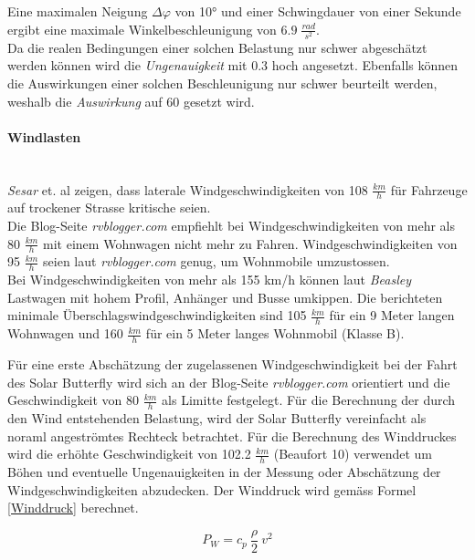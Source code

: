\begin{description}
    Eine maximalen Neigung $\Delta \varphi$ von 10° und einer Schwingdauer von einer Sekunde ergibt eine maximale Winkelbeschleunigung von $6.9 \; \frac{rad}{s^2}$.\\
    Da die realen Bedingungen einer solchen Belastung nur schwer abgeschätzt werden können wird die \emph{Ungenauigkeit} mit 0.3 hoch angesetzt. Ebenfalls können die Auswirkungen einer solchen Beschleunigung nur schwer beurteilt werden, weshalb die \emph{Auswirkung} auf 60 gesetzt wird.
  \end{description}

  \paragraph{Windlasten}\mbox{}\\
  \emph{Sesar} et. al \cite{Wind.1} zeigen, dass laterale Windgeschwindigkeiten von 108 $\frac{km}{h}$ für Fahrzeuge auf trockener Strasse kritische seien.\\
  Die Blog-Seite \emph{rvblogger.com} \cite{Wind.2} empfiehlt bei Windgeschwindigkeiten von mehr als 80 $\frac{km}{h}$ mit einem Wohnwagen nicht mehr zu Fahren. Windgeschwindigkeiten von 95 $\frac{km}{h}$ seien laut \emph{rvblogger.com} genug, um Wohnmobile umzustossen.\\
  Bei Windgeschwindigkeiten von mehr als 155 km/h können laut \emph{Beasley} \cite{Wind.3} Lastwagen mit hohem Profil, Anhänger und Busse umkippen. Die berichteten minimale Überschlagswindgeschwindigkeiten sind 105 $\frac{km}{h}$ für ein 9 Meter langen Wohnwagen und 160 $\frac{km}{h}$ für ein 5 Meter langes Wohnmobil (Klasse B).

  Für eine erste Abschätzung der zugelassenen Windgeschwindigkeit bei der Fahrt des Solar Butterfly wird sich an der Blog-Seite \emph{rvblogger.com} orientiert und die Geschwindigkeit von 80 $\frac{km}{h}$ als Limitte festgelegt. Für die Berechnung der durch den Wind entstehenden Belastung, wird der Solar Butterfly vereinfacht als noraml angeströmtes Rechteck betrachtet. Für die Berechnung des Winddruckes wird die erhöhte Geschwindigkeit von 102.2 $\frac{km}{h}$ (Beaufort 10) verwendet um Böhen und eventuelle Ungenauigkeiten in der Messung oder Abschätzung der Windgeschwindigkeiten abzudecken. Der Winddruck wird gemäss Formel \ref{Winddruck} berechnet.

  \begin{equation}
    \label{Winddruck}
    P_W = c_p \: \frac{\rho}{2}\: v^2
  \end{equation}

